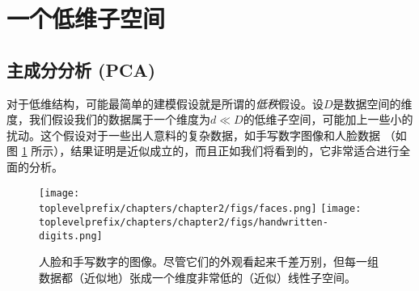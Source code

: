\documentclass[../../book-main.tex]{subfiles}
\begin{document}








\section{一个低维子空间} \label{sec:lowrank}

\subsection{主成分分析 (PCA)} \label{sub:pca}

对于低维结构，可能最简单的建模假设就是所谓的\textit{低秩}假设。设\(D\)是数据空间的维度，我们假设我们的数据属于一个维度为\(d \ll D\)的低维子空间，可能加上一些小的扰动。这个假设对于一些出人意料的复杂数据，如手写数字图像和人脸数据 \cite{BasriR2003-PAMI}（如图 \ref{fig:faces-digits} 所示），结果证明是近似成立的，而且正如我们将看到的，它非常适合进行全面的分析。

\begin{figure}
    \centering
    \texttt{[image: \\toplevelprefix/chapters/chapter2/figs/faces.png]}
    \hspace{5mm} \texttt{[image: \\toplevelprefix/chapters/chapter2/figs/handwritten-digits.png]}   
    \caption{人脸和手写数字的图像。尽管它们的外观看起来千差万别，但每一组数据都（近似地）张成一个维度非常低的（近似）线性子空间。}
    \label{fig:faces-digits}
\end{figure}
\end{document}
